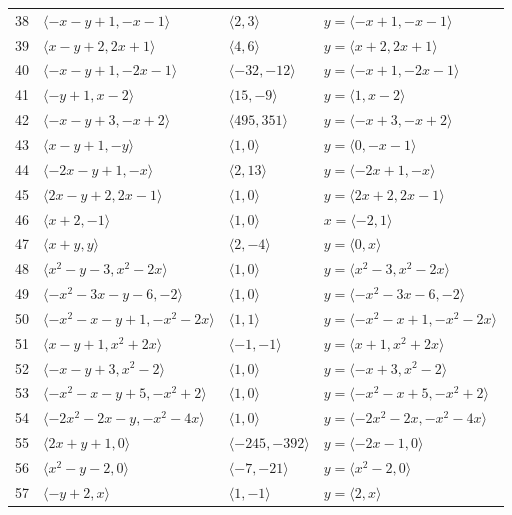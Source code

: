 \documentclass[11pt]{article}
\begin{document}
\begin{longtable}{@{}rlll@{}}
38 & $\langle -x-y+1,-x-1\rangle$ & $\langle 2,3\rangle$ & $y=\langle -x+1,-x-1\rangle$\\
39 & $\langle x-y+2,2x+1\rangle$ & $\langle 4,6\rangle$ & $y=\langle x+2,2x+1\rangle$\\
40 & $\langle -x-y+1,-2x-1\rangle$ & $\langle -32,-12\rangle$ & $y=\langle -x+1,-2x-1\rangle$\\
41 & $\langle -y+1,x-2\rangle$ & $\langle 15,-9\rangle$ & $y=\langle 1,x-2\rangle$\\
42 & $\langle -x-y+3,-x+2\rangle$ & $\langle 495,351\rangle$ & $y=\langle -x+3,-x+2\rangle$\\
43 & $\langle x-y+1,-y\rangle$ & $\langle 1,0\rangle$ & $y=\langle 0,-x-1\rangle$\\
44 & $\langle -2x-y+1,-x\rangle$ & $\langle 2,13\rangle$ & $y=\langle -2x+1,-x\rangle$\\
45 & $\langle 2x-y+2,2x-1\rangle$ & $\langle 1,0\rangle$ & $y=\langle 2x+2,2x-1\rangle$\\
46 & $\langle x+2,-1\rangle$ & $\langle 1,0\rangle$ & $x=\langle -2,1\rangle$\\
47 & $\langle x+y,y\rangle$ & $\langle 2,-4\rangle$ & $y=\langle 0,x\rangle$\\
48 & $\langle x^{2}-y-3,x^{2}-2x\rangle$ & $\langle 1,0\rangle$ & $y=\langle x^{2}-3,x^{2}-2x\rangle$\\
49 & $\langle -x^{2}-3x-y-6,-2\rangle$ & $\langle 1,0\rangle$ & $y=\langle -x^{2}-3x-6,-2\rangle$\\
50 & $\langle -x^{2}-x-y+1,-x^{2}-2x\rangle$ & $\langle 1,1\rangle$ & $y=\langle -x^{2}-x+1,-x^{2}-2x\rangle$\\
51 & $\langle x-y+1,x^{2}+2x\rangle$ & $\langle -1,-1\rangle$ & $y=\langle x+1,x^{2}+2x\rangle$\\
52 & $\langle -x-y+3,x^{2}-2\rangle$ & $\langle 1,0\rangle$ & $y=\langle -x+3,x^{2}-2\rangle$\\
53 & $\langle -x^{2}-x-y+5,-x^{2}+2\rangle$ & $\langle 1,0\rangle$ & $y=\langle -x^{2}-x+5,-x^{2}+2\rangle$\\
54 & $\langle -2x^{2}-2x-y,-x^{2}-4x\rangle$ & $\langle 1,0\rangle$ & $y=\langle -2x^{2}-2x,-x^{2}-4x\rangle$\\
55 & $\langle 2x+y+1,0\rangle$ & $\langle -245,-392\rangle$ & $y=\langle -2x-1,0\rangle$\\
56 & $\langle x^{2}-y-2,0\rangle$ & $\langle -7,-21\rangle$ & $y=\langle x^{2}-2,0\rangle$\\
57 & $\langle -y+2,x\rangle$ & $\langle 1,-1\rangle$ & $y=\langle 2,x\rangle$\\

\end{longtable}
\end{document}
